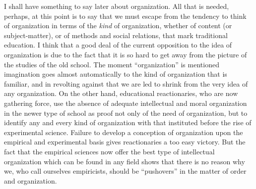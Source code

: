 I shall have something to say later about organization. All that is needed, perhaps, at 
this point is to say that we must escape from the tendency to think of organization in 
terms of the \textit{kind} of organization, whether of content (or subject-matter), or of methods 
and social relations, that mark traditional education. I think that a good deal of the current 
opposition to the idea of organization is due to the fact that it is so hard to get away from 
the picture of the studies of the old school. The moment \enquote{organization} is mentioned 
imagination goes almost automatically to the kind of organization that is familiar, and in 
revolting against that we are led to shrink from the very idea of any organization. On the 
other hand, educational reactionaries, who are now gathering force, use the absence of 
adequate intellectual and moral organization in the newer type of school as proof not only 
of the need of organization, but to identify any and every kind of organization with that 
instituted before the rise of experimental science. Failure to develop a conception of 
organization upon the empirical and experimental basis gives reactionaries a too easy 
victory. But the fact that the empirical sciences now offer the best type of intellectual 
organization which can be found in any field shows that there is no reason why we, who 
call ourselves empiricists, should be \enquote{pushovers} in the matter of order and organization. 
